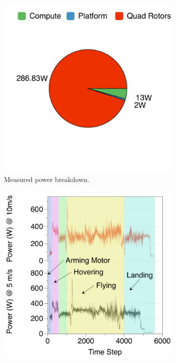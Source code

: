 \begin{figure}[!t]
\centering
    \begin{subfigure}{.49\columnwidth}
    \centering
    \includegraphics[trim=0 0 0 0, clip, width=1.0\columnwidth]{figs/power_break_down_tx2}
    \caption{Measured power breakdown.}
    \label{fig:SOLO-power-breakdown}
    \end{subfigure}
    \begin{subfigure}{.49\columnwidth}
    \centering
    \includegraphics[trim=0 0 0 0, clip, width=1.0\columnwidth]{figs/drone-power-time-series}

\end{subfigure}
\end{figure}
